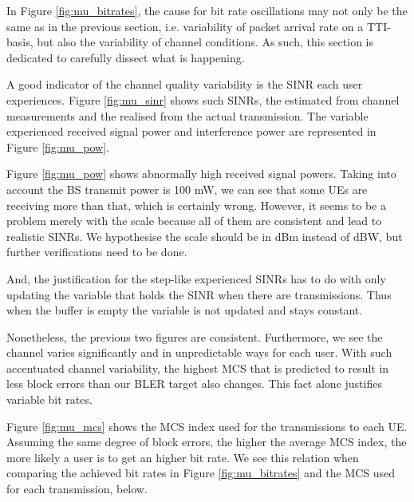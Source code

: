 In Figure \ref{fig:mu_bitrates}, the cause for bit rate oscillations may not only be the same as in the previous section, i.e. variability of packet arrival rate on a TTI-basis, but also the variability of channel conditions. As such, this section is dedicated to carefully dissect what is happening.

A good indicator of the channel quality variability is the SINR each user experiences. Figure \ref{fig:mu_sinr} shows such \acsp{SINR}, the estimated from channel measurements and the realised from the actual transmission. The variable experienced received signal power and interference power are represented in Figure \ref{fig:mu_pow}.



Figure \ref{fig:mu_pow} shows abnormally high received signal powers. Taking into account the \acs{BS} transmit power is 100 mW, we can see that some \acsp{UE} are receiving more than that, which is certainly wrong. However, it seems to be a problem merely with the scale because all of them are consistent and lead to realistic \acsp{SINR}. We hypothesise the scale should be in dBm instead of dBW, but further verifications need to be done.

And, the justification for the step-like experienced SINRs has to do with only updating the variable that holds the SINR when there are transmissions. Thus when the buffer is empty the variable is not updated and stays constant. 

Nonetheless, the previous two figures are consistent. Furthermore, we see the channel varies significantly and in unpredictable ways for each user. With such accentuated channel variability, the highest MCS that is predicted to result in less block errors than our BLER target also changes. This fact alone justifies variable bit rates.

Figure \ref{fig:mu_mcs} shows the \ac{MCS} index used for the transmissions to each \acs{UE}. Assuming the same degree of block errors, the higher the average MCS index, the more likely a user is to get an higher bit rate. We see this relation when comparing the achieved bit rates in Figure \ref{fig:mu_bitrates} and the MCS used for each transmission, below.


